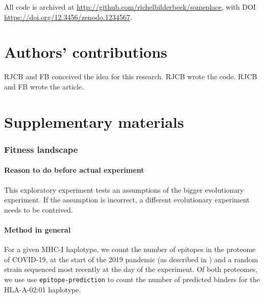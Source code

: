 \documentclass{article}
\begin{document}
All code is archived at \url{http://github.com/richelbilderbeek/someplace},
with DOI \url{https://doi.org/12.3456/zenodo.1234567}.

\section{Authors' contributions}

RJCB and FB conceived the idea for this research. 
RJCB wrote the code.
RJCB and FB wrote the article.





\appendix
\section{Supplementary materials}

\subsubsection{Fitness landscape}
\label{subsec:fitness_landscape}

\paragraph{Reason to do before actual experiment}
This exploratory experiment tests an assumptions 
of the bigger evolutionary experiment. 
If the assumption is incorrect,
a different evolutionary experiment needs to be contrived.

\paragraph{Method in general}
For a given MHC-I haplotype, we count the number of epitopes in 
the proteome of COVID-19, at the start of the 2019 pandemic (as
described in \cite{wu2020new})
and a random strain sequenced most recently at the day of the experiment. 
Of both proteomes, we use use \verb;epitope-prediction; \cite{bianchi2017} 
to count the number of predicted binders for the HLA-A-02:01 haplotype.
\end{document}
